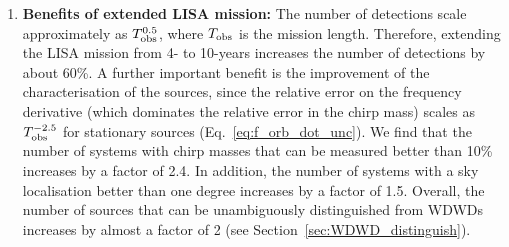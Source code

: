 \begin{enumerate}
 
   \item \textbf{Benefits of extended LISA mission:} The number of detections scale approximately as $T_{\rm obs}^{0.5}$, where $T_{\rm obs}$ is the mission length. Therefore, extending the LISA mission from 4- to 10-years increases the number of detections by about 60\%.
   A further important benefit is the improvement of the characterisation of the sources, since the relative error on the frequency derivative (which dominates the relative error in the chirp mass) scales as $T_{\rm obs}^{-2.5}$ for stationary sources (Eq.~\ref{eq:f_orb_dot_unc}).
   We find that the number of systems with chirp masses that can be measured better than 10\% increases by a factor of 2.4.
   In addition, the number of systems with a sky localisation better than one degree increases by a factor of 1.5.
   Overall, the number of sources that can be unambiguously distinguished from WDWDs increases by almost a factor of 2 (see Section~\ref{sec:WDWD_distinguish}).
\end{enumerate}